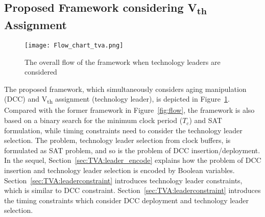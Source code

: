 \subsection{Proposed Framework considering V\textsubscript{th} Assignment}
\label{sec:TVA:framework}
\begin{figure}
	\centering
	\texttt{[image: Flow\_chart\_tva.png]}
	\caption{The overall flow of the framework when technology leaders are considered }
	\label{fig:flow:tva}
\end{figure}
The proposed framework, which simultaneously considers aging manipulation (DCC) and V\textsubscript{th} assignment (technology leader), is depicted in Figure~\ref{fig:flow:tva}. Compared with the former framework in Figure~\ref{fig:flow}, the framework is also based on a binary search for the minimum clock period ($T_c$) and SAT formulation, while timing constraints need to consider the technology leader selection. The problem, technology leader selection from clock buffers, is formulated as SAT problem, and so is the problem of DCC insertion/deployment. In the sequel, Section~\ref{sec:TVA:leader_encode} explains how the problem of DCC insertion and technology leader selection is encoded by Boolean variables. Section~\ref{sec:TVA:leaderconstraint} introduces technology leader constraints, which is similar to DCC constraint. Section~\ref{sec:TVA:leaderconstraint} introduces the timing constraints which consider DCC deployment and technology leader selection.

